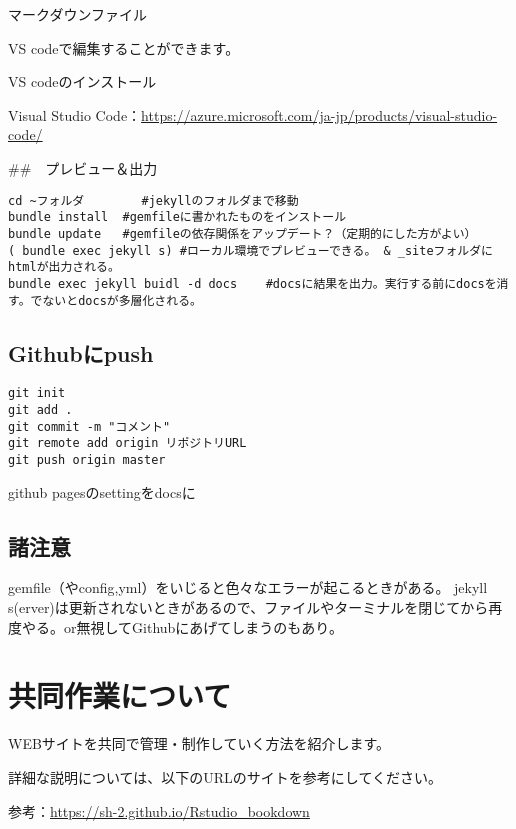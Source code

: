 \documentclass[
]{book}
\begin{document}
マークダウンファイル

VS codeで編集することができます。

VS codeのインストール

Visual Studio Code：\url{https://azure.microsoft.com/ja-jp/products/visual-studio-code/}

\#\#　プレビュー＆出力

\begin{verbatim}
cd ~フォルダ 		#jekyllのフォルダまで移動
bundle install	#gemfileに書かれたものをインストール
bundle update 	#gemfileの依存関係をアップデート？（定期的にした方がよい）
( bundle exec jekyll s)	#ローカル環境でプレビューできる。 & _siteフォルダにhtmlが出力される。
bundle exec jekyll buidl -d docs	#docsに結果を出力。実行する前にdocsを消す。でないとdocsが多層化される。
\end{verbatim}

\hypertarget{githubux306bpush}{%
\section{Githubにpush}\label{githubux306bpush}}

\begin{verbatim}
git init
git add .
git commit -m "コメント"
git remote add origin リポジトリURL
git push origin master
\end{verbatim}

github pagesのsettingをdocsに

\hypertarget{ux8af8ux6ce8ux610f}{%
\section{諸注意}\label{ux8af8ux6ce8ux610f}}

gemfile（やconfig,yml）をいじると色々なエラーが起こるときがある。
jekyll s(erver)は更新されないときがあるので、ファイルやターミナルを閉じてから再度やる。or無視してGithubにあげてしまうのもあり。

\hypertarget{ux5171ux540cux4f5cux696dux306bux3064ux3044ux3066}{%
\chapter{共同作業について}\label{ux5171ux540cux4f5cux696dux306bux3064ux3044ux3066}}

WEBサイトを共同で管理・制作していく方法を紹介します。

詳細な説明については、以下のURLのサイトを参考にしてください。

参考：\url{https://sh-2.github.io/Rstudio_bookdown}
\end{document}
